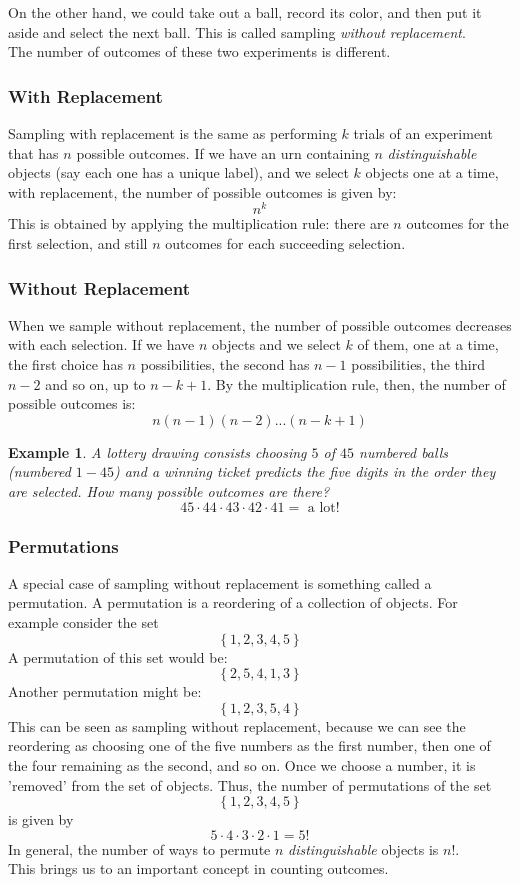 \documentclass[12pt]{article} %
\newtheorem{example}{Example}
\begin{document}
On the other hand, we could take out a ball, record its color, and then put it aside and select the next ball. This is called sampling \emph{without replacement}. \\

The number of outcomes of these two experiments is different. 
\subsubsection{With Replacement}
Sampling with replacement is the same as performing $k$ trials of an experiment that has $n$ possible outcomes. If we have an urn containing $n$ \emph{distinguishable} objects (say each one has a unique label), and we select $k$ objects one at a time, with replacement, the number of possible outcomes is given by:
$$n^k$$
This is obtained by applying the multiplication rule: there are $n$ outcomes for the first selection, and still $n$ outcomes for each succeeding selection.

\subsubsection{Without Replacement}
When we sample without replacement, the number of possible outcomes decreases with each selection. If we have $n$ objects and we select $k$ of them, one at a time, the first choice has $n$ possibilities, the second has $n-1$ possibilities, the third $n-2$ and so on, up to $n-k+1$. By the multiplication rule, then, the number of possible outcomes is:
$$n(n-1)(n-2)...(n-k+1)$$
\begin{example}
A lottery drawing consists choosing $5$ of $45$ numbered balls (numbered $1-45$) and a winning ticket predicts the five digits \emph{in the order they are selected}. How many possible outcomes are there?
$$45\cdot44\cdot43\cdot42\cdot41 = \textrm{ a lot!}$$ 
\end{example}
\subsubsection{Permutations}
A special case of sampling without replacement is something called a permutation. A permutation is a reordering of a collection of objects. For example consider the set
$$\left\{1,2,3,4,5\right\}$$
A permutation of this set would be:
$$\left\{2,5,4,1,3\right\}$$
Another permutation might be:
$$\left\{1,2,3,5,4\right\}$$
This can be seen as sampling without replacement, because we can see the reordering as choosing one of the five numbers as the first number, then one of the four remaining as the second, and so on. Once we choose a number, it is 'removed' from the set of objects. Thus, the number of permutations of the set 
$$\left\{1,2,3,4,5\right\}$$
is given by 
$$5\cdot4\cdot3\cdot2\cdot1 = 5!$$
In general, the number of ways to permute $n$ \emph{distinguishable} objects is $n!$.\\
This brings us to an important concept in counting outcomes.
\end{document}
